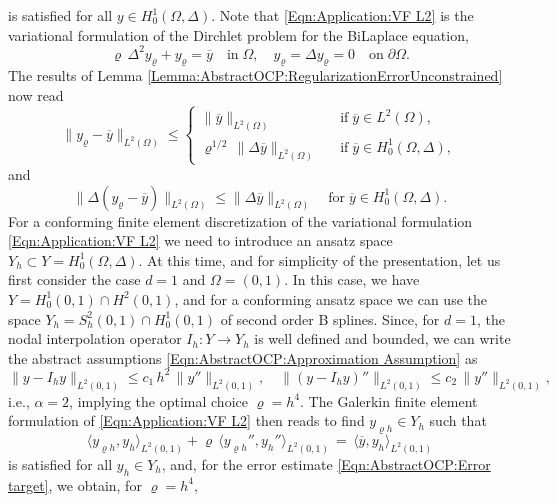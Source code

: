 \documentclass{article}
\numberwithin{equation}{section}
\begin{document}
is satisfied for all $y \in H^1_0(\Omega,\Delta)$. Note that
\eqref{Eqn:Application:VF L2} is the variational formulation of the
Dirchlet problem for the BiLaplace equation,
\begin{equation}\label{Eqn:Application:L2 BiLaplace}
  \varrho \, \Delta^2 y_\varrho + y_\varrho = \overline{y} \quad
  \mbox{in} \; \Omega, \quad
  y_\varrho = \Delta y_\varrho = 0 \quad
  \mbox{on} \; \partial \Omega .
\end{equation}
The results of Lemma \ref{Lemma:AbstractOCP:RegularizationErrorUnconstrained}
now read
\[
  \| y_\varrho - \overline{y} \|_{L^2(\Omega)} \leq
  \left \{
    \begin{array}{ccl}
      \| \overline{y}  \|_{L^2(\Omega)}
      & & \mbox{if} \; \overline{y} \in L^2(\Omega), \\[1mm]
      \varrho^{1/2} \, \| \Delta \overline{y} \|_{L^2(\Omega)}
      && \mbox{if} \; \overline{y} \in H^1_0(\Omega,\Delta),
    \end{array}
  \right.
\]
and
\[
  \| \Delta (y_\varrho - \overline{y}) \|_{L^2(\Omega)} \leq
  \| \Delta \overline{y} \|_{L^2(\Omega)} \quad \mbox{for} \;
  \overline{y} \in H^1_0(\Omega,\Delta).
\]
For a conforming finite element discretization of the variational
formulation \eqref{Eqn:Application:VF L2} we need to introduce
an ansatz space $Y_h \subset Y = H^1_0(\Omega,\Delta)$. 
At this time,
and for simplicity of the presentation, let us first consider the case
$d=1$
and $\Omega = (0,1)$. In this case, we have $Y=H^1_0(0,1) \cap H^2(0,1)$,
and for a conforming ansatz space we can use the space
$Y_h = S_h^2(0,1) \cap H^1_0(0,1)$ of second order B splines. 
Since, for
$d=1$,
the nodal interpolation operator $I_h : Y \to Y_h$ is
well defined and bounded, we can write the abstract
assumptions \eqref{Eqn:AbstractOCP:Approximation Assumption} as
\[
  \| y - I_h y \|_{L^2(0,1)} \leq c_1 \, h^2 \, \| y'' \|_{L^2(0,1)}, \quad
  \| (y-I_hy)'' \|_{L^2(0,1)}  \leq c_2 \, \| y'' \|_{L^2(0,1)}, 
\]
i.e., $\alpha = 2$, implying the optimal choice $\varrho = h^4$.
The Galerkin finite element formulation of \eqref{Eqn:Application:VF L2}
then reads to find $y_{\varrho h} \in Y_h$ such that
\begin{equation}\label{Eqn:Application:VF L2 FEM}
  \langle y_{\varrho h} , y_h \rangle_{L^2(0,1)} + \varrho \,
  \langle y_{\varrho h}'' , y_h'' \rangle_{L^2(0,1)} 
  \, = \,
  \langle \overline{y} , y_h \rangle_{L^2(0,1)}
\end{equation}
is satisfied for all $y_h \in Y_h$, and, for the error estimate
\eqref{Eqn:AbstractOCP:Error target}, we obtain, for $\varrho=h^4$,
\end{document}
